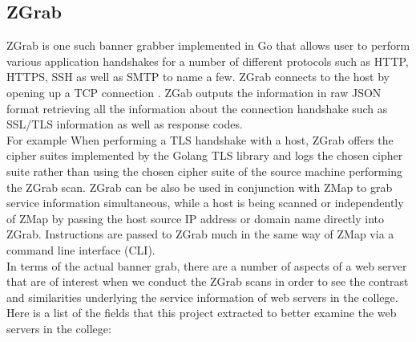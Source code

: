 \documentclass[a4wide,leqno,12pt]{report}
\begin{document}
\subsection{ZGrab}
ZGrab is one such banner grabber implemented in Go \cite{pike2009go} that allows user to perform various application handshakes for a number of different protocols such as HTTP, HTTPS, SSH \cite{ylonen2006secure} as well as SMTP\cite{2012smtp} to name a few. ZGrab connects to the host by opening up a TCP connection \cite{durumeric2015search}. ZGab outputs the information in raw JSON format retrieving all the information about the connection handshake such as SSL/TLS information as well as response codes.\\

For example When performing a TLS handshake with a host, ZGrab offers the cipher suites implemented by the Golang TLS library and logs the chosen cipher suite\cite{durumeric2015search} rather than using the chosen cipher suite of the source machine performing the ZGrab scan. ZGrab can be also be used in conjunction with ZMap to grab service information simultaneous, while a host is being scanned or independently of ZMap by passing the host source IP address or domain name directly into ZGrab. Instructions are passed to ZGrab much in the same way of ZMap via a command line interface (CLI).\\

In terms of the actual banner grab, there are a number of aspects of a web server that are of interest when we conduct the ZGrab scans in order to see the contrast and similarities underlying the service information of web servers in the college.\\
Here is a list of the fields that this project extracted to better examine the web servers in the college:
\end{document}
